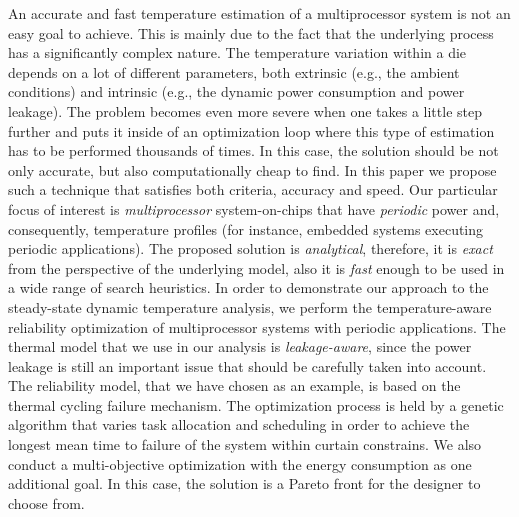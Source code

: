   An accurate and fast temperature estimation of a multiprocessor system is not an easy goal to achieve. This is mainly due to the fact that the underlying process has a significantly complex nature. The temperature variation within a die depends on a lot of different parameters, both extrinsic (e.g., the ambient conditions) and intrinsic (e.g., the dynamic power consumption and power leakage). The problem becomes even more severe when one takes a little step further and puts it inside of an optimization loop where this type of estimation has to be performed thousands of times. In this case, the solution should be not only accurate, but also computationally cheap to find. In this paper we propose such a technique that satisfies both criteria, accuracy and speed.
  Our particular focus of interest is \emph{multiprocessor} system-on-chips that have \emph{periodic} power and, consequently, temperature profiles (for instance, embedded systems executing periodic applications). The proposed solution is \emph{analytical}, therefore, it is \emph{exact} from the perspective of the underlying model, also it is \emph{fast} enough to be used in a wide range of search heuristics. In order to demonstrate our approach to the steady-state dynamic temperature analysis, we perform the temperature-aware reliability optimization of multiprocessor systems with periodic applications.
  The thermal model that we use in our analysis is \emph{leakage-aware}, since the power leakage is still an important issue that should be carefully taken into account. The reliability model, that we have chosen as an example, is based on the thermal cycling failure mechanism.
  The optimization process is held by a genetic algorithm that varies task allocation and scheduling in order to achieve the longest mean time to failure of the system within curtain constrains. We also conduct a multi-objective optimization with the energy consumption as one additional goal. In this case, the solution is a Pareto front for the designer to choose from.
